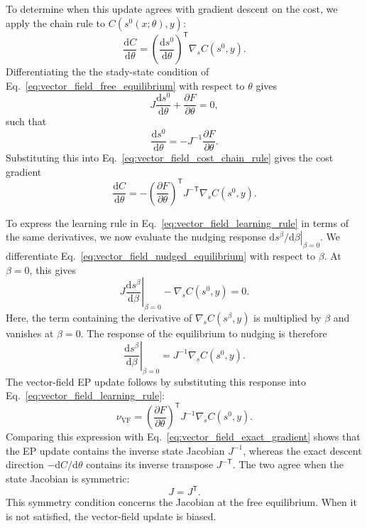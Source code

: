 \documentclass{article}
\begin{document}
To determine when this update agrees with gradient descent on the cost,
we apply the chain rule to $C(s^0(x;\theta),y)$:
\begin{equation}
\frac{\mathrm dC}{\mathrm d\theta}
=
\left(\frac{\mathrm ds^0}{\mathrm d\theta}\right)^{\mathsf T}
\nabla_s C(s^0,y).
\label{eq:vector_field_cost_chain_rule}
\end{equation}
Differentiating the the stady-state condition of Eq.~\eqref{eq:vector_field_free_equilibrium} with respect to $\theta$ gives
\begin{equation}
J\frac{\mathrm d s^0}{\mathrm d\theta}
+\frac{\partial F}{\partial\theta}=0,
\end{equation}
such that
\begin{equation}
\frac{\mathrm d s^0}{\mathrm d\theta}
=-J^{-1}\frac{\partial F}{\partial\theta}.
\end{equation}
Substituting this into Eq.~\eqref{eq:vector_field_cost_chain_rule}
gives the cost gradient
\begin{equation}
\frac{\mathrm dC}{\mathrm d\theta}
=
-\left(\frac{\partial F}{\partial\theta}\right)^{\mathsf T}
J^{-\mathsf T}
\nabla_s C(s^0,y).
\label{eq:vector_field_exact_gradient}
\end{equation}

To express the learning rule in Eq.~\eqref{eq:vector_field_learning_rule}
in terms of the same derivatives, we now evaluate the nudging response
$\left.\mathrm ds^\beta/\mathrm d\beta\right|_{\beta=0}$. We differentiate
Eq.~\eqref{eq:vector_field_nudged_equilibrium} with respect to $\beta$. At $\beta=0$, this gives
\begin{equation}
J
\left.\frac{\mathrm ds^\beta}{\mathrm d\beta}\right|_{\beta=0}
-\nabla_s C(s^0,y)=0.
\label{eq:vector_field_nudging_derivative}
\end{equation}
Here, the term containing the derivative of $\nabla_s C(s^\beta,y)$ is
multiplied by $\beta$ and vanishes at $\beta=0$. The response of the
equilibrium to nudging is therefore
\begin{equation}
\left.\frac{\mathrm ds^\beta}{\mathrm d\beta}\right|_{\beta=0}
=
J^{-1}
\nabla_s C(s^0,y).
\label{eq:vector_field_nudging_sensitivity}
\end{equation}
The vector-field EP update follows by substituting this response into
Eq.~\eqref{eq:vector_field_learning_rule}:
\begin{equation}
\nu_{\mathrm{VF}}
=
\left(\frac{\partial F}{\partial\theta}\right)^{\mathsf T}
J^{-1}
\nabla_s C(s^0,y).
\label{eq:vector_field_update_response}
\end{equation}
Comparing this expression with Eq.~\eqref{eq:vector_field_exact_gradient}
shows that the EP update contains the inverse state Jacobian $J^{-1}$,
whereas the exact descent direction $-\mathrm dC/\mathrm d\theta$ contains
its inverse transpose $J^{-\mathsf T}$. The two agree when the state
Jacobian is symmetric:
\begin{equation}
J=J^{\mathsf T}.
\label{eq:vector_field_symmetry}
\end{equation}
This symmetry condition concerns the Jacobian at the free equilibrium.
When it is not satisfied, the vector-field update is biased.
\end{document}
